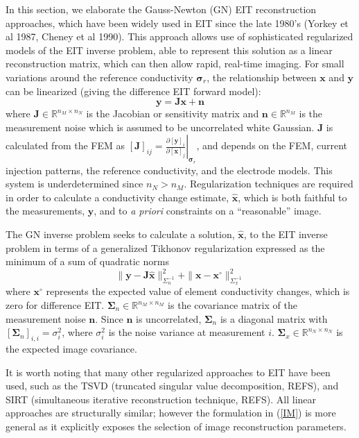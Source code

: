 \documentclass[12pt]{iopart}
\newcommand{\xB}{\mbox{$\mathbf{x}$}}
\newcommand{\xH}{\mbox{$\mathbf{\hat x}$}}
\newcommand{\nB}{\mbox{$\mathbf{n}$}}
\newcommand{\yB}{\mbox{$\mathbf{y}$}}
\newcommand{\JB}{\mbox{$\mathbf{J}$}}
\newcommand{\SG}{\mbox{${\boldsymbol \Sigma}$}}
\newcommand{\sG}{\mbox{${\boldsymbol \sigma}$}}
\begin{document}
In this section, we elaborate the
Gauss-Newton (GN) EIT reconstruction approaches,
which have been
widely used in EIT since the late 1980's (Yorkey et al 1987,
Cheney et al 1990).
This approach allows use of sophisticated regularized models
of the EIT inverse problem, able to represent this
solution as a linear reconstruction matrix, which can then allow
rapid, real-time imaging.
For small variations around the reference
conductivity $\sG_r$, the relationship between $\xB$ and $\yB$ can
be linearized (giving the difference EIT forward model):
\begin{equation}\label{FM}
\yB=\JB\xB+\nB
\end{equation}
where
$\JB\in\mathbb{R}^{n_M\times n_N}$ is the Jacobian or sensitivity
matrix and $\nB\in\mathbb{R}^{n_M}$ is the measurement noise which is
assumed to be uncorrelated white Gaussian. $\JB$ is calculated from
the FEM as
$[\JB]_{ij}=\left.
     \frac{\partial[\yB]_i}{\partial[\xB]_j}
          \right|_{\sG_r}$,
and depends on the FEM, current injection patterns, the reference
conductivity, and the electrode models. This system is
underdetermined since $n_N > n_M$. 
Regularization techniques are required
in order to calculate a conductivity change
estimate, $\xH$, which is both
faithful to the measurements, $\yB$, and to
{\em a priori} constraints on a ``reasonable'' image.

The GN inverse problem seeks to
calculate a solution, $\xH$, to the EIT inverse problem
in terms of a generalized Tikhonov regularization 
expressed as the minimum of a sum of quadratic norms
\begin{equation}\label{IM}
 \|\yB-\JB\xH\|_{\Sigma_n^{-1}}^2 +
 \|\xB-\xB^\circ\|_{\Sigma_x^{-1}}^2
\end{equation}
where $\xB^\circ$ represents the expected value of element
conductivity changes, which is zero for  difference EIT.
$\SG_n\in\mathbb{R}^{n_M\times n_M}$ is
 the covariance matrix of the measurement noise $\nB$. Since
$\nB$ is uncorrelated, $\SG_n$ is a diagonal matrix with
$[\SG_n]_{i,i}=\sigma_i^2$, where $\sigma_i^2$ is the noise variance at
measurement $i$. $\SG_x\in\mathbb{R}^{n_N\times
n_N}$ is the expected image covariance.

It is worth noting that many other regularized approaches
to EIT have been used, such as the
TSVD (truncated singular value decomposition, REFS),
and
SIRT (simultaneous iterative reconstruction technique, REFS).
All linear approaches are structurally similar; however
the formulation in (\ref{IM}) is more general
as it explicitly exposes the selection of image reconstruction
parameters.
\end{document}
